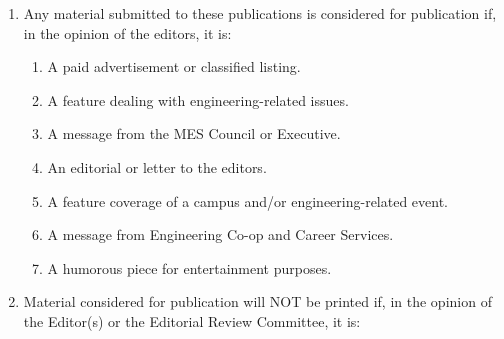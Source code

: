 \begin{enumerate}
 \item
  Any material submitted to these publications is considered for
  publication if, in the opinion of the editors, it is:

  \begin{enumerate}
   \item
    A paid advertisement or classified listing.
   \item
    A feature dealing with engineering-related issues.
   \item
    A message from the MES Council or Executive.
   \item
    An editorial or letter to the editors.
   \item
    A feature coverage of a campus and/or engineering-related event.
   \item
    A message from Engineering Co-op and Career Services.
   \item
    A humorous piece for entertainment purposes.
  \end{enumerate}
 \item
  Material considered for publication will NOT be printed if, in the
  opinion of the Editor(s) or the Editorial Review Committee, it is:


\end{enumerate}
